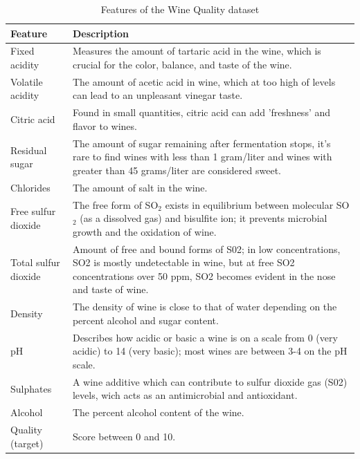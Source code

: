 \documentclass{ieeeaccess}
\begin{document}
    \begin{table}[h!]
        \centering
        \begin{tabular}{|>{\raggedright\arraybackslash}p{4cm}|>{\raggedright\arraybackslash}p{8cm}|}
        \hline
        \textbf{Feature} & \textbf{Description} \\
        \hline
        Fixed acidity & Measures the amount of tartaric acid in the wine, which is crucial for the color, balance, and taste of the wine. \\
        \hline
        Volatile acidity & The amount of acetic acid in wine, which at too high of levels can lead to an unpleasant vinegar taste. \\
        \hline
        Citric acid & Found in small quantities, citric acid can add 'freshness' and flavor to wines. \\
        \hline
        Residual sugar & The amount of sugar remaining after fermentation stops, it's rare to find wines with less than 1 gram/liter and wines with greater than 45 grams/liter are considered sweet. \\
        \hline
        Chlorides & The amount of salt in the wine. \\
        \hline
        Free sulfur dioxide & The free form of SO\(_2\) exists in equilibrium between molecular SO\(_2\) (as a dissolved gas) and bisulfite ion; it prevents microbial growth and the oxidation of wine. \\
        \hline
        Total sulfur dioxide & Amount of free and bound forms of S02; in low concentrations, SO2 is mostly undetectable in wine, but at free SO2 concentrations over 50 ppm, SO2 becomes evident in the nose and taste of wine. \\
        \hline
        Density & The density of wine is close to that of water depending on the percent alcohol and sugar content. \\
        \hline
        pH & Describes how acidic or basic a wine is on a scale from 0 (very acidic) to 14 (very basic); most wines are between 3-4 on the pH scale. \\
        \hline
        Sulphates & A wine additive which can contribute to sulfur dioxide gas (S02) levels, wich acts as an antimicrobial and antioxidant. \\
        \hline
        Alcohol & The percent alcohol content of the wine. \\
        \hline
        Quality (target) & Score between 0 and 10. \\
        \hline
        \end{tabular}
        \caption{Features of the Wine Quality dataset}
        \label{tbl.2}
        \end{table}
    
\end{document}
